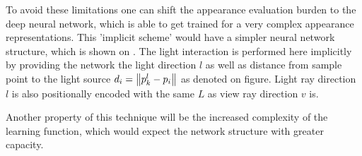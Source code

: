 To avoid
these limitations one can shift the appearance evaluation burden to the deep neural network,
which is able to get trained for a very complex appearance representations.
This 'implicit scheme' would have a simpler neural network structure,
which is shown on .
The light interaction is performed here implicitly by providing 
the network the light direction $l$ as well as distance from sample point to the light source $d_i = \norm{p^l_k - p_i}$
as denoted on figure.
Light ray direction $l$ is also positionally encoded with the same $L$ as view ray direction $v$ is.

Another property of this technique will be the increased complexity of the learning function,
which would expect the network structure with greater capacity.









